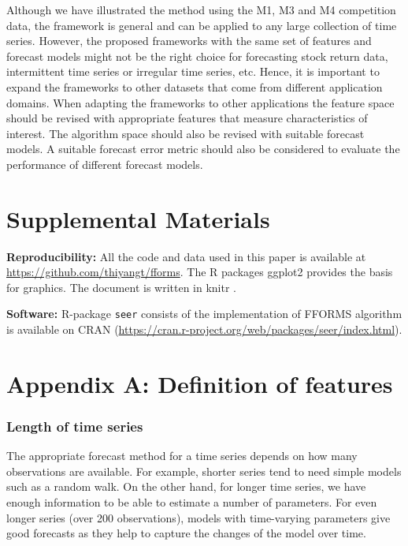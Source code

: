 \documentclass[11pt,a4paper,]{article}
\begin{document}
Although we have illustrated the method using the M1, M3 and M4 competition data, the framework is general and can be applied to any large collection of time series. However, the proposed frameworks with the same set of features and forecast
models might not be the right choice for forecasting stock return data, intermittent time series or irregular
time series, etc. Hence, it is important to expand the frameworks to other datasets that come from different application domains. When adapting the frameworks to other applications the feature space should be revised with appropriate features that measure characteristics of interest. The algorithm space should also be revised with suitable forecast models. A suitable forecast error metric should also be considered to evaluate the performance of different forecast models.

\hypertarget{supplemental-materials}{%
\section*{Supplemental Materials}\label{supplemental-materials}}

\textbf{Reproducibility:} All the code and data used in this paper is available at \url{https://github.com/thiyangt/fforms}. The R packages ggplot2 \autocite{ggplot} provides the basis for graphics. The document is written in knitr \autocite{xie2017dynamic}.

\textbf{Software:} R-package \texttt{seer} consists of the implementation of FFORMS algorithm is available on CRAN (\url{https://cran.r-project.org/web/packages/seer/index.html}).

\hypertarget{appendix-a-definition-of-features}{%
\section*{Appendix A: Definition of features}\label{appendix-a-definition-of-features}}

\hypertarget{length-of-time-series}{%
\subsubsection*{Length of time series}\label{length-of-time-series}}

The appropriate forecast method for a time series depends on how many observations are available. For example, shorter series tend to need simple models such as a random walk. On the other hand, for longer time series, we have enough information to be able to estimate a number of parameters. For even longer series (over 200 observations), models with time-varying parameters give good forecasts as they help to capture the changes of the model over time.
\end{document}

